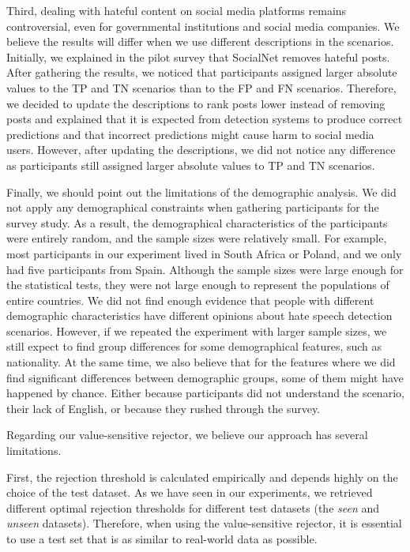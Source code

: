 %
Third, dealing with hateful content on social media platforms remains controversial, even for governmental institutions and social media companies.
%
We believe the results will differ when we use different descriptions in the scenarios.
%
Initially, we explained in the pilot survey that SocialNet removes hateful posts.
%
After gathering the results, we noticed that participants assigned larger absolute values to the TP and TN scenarios than to the FP and FN scenarios.
%
Therefore, we decided to update the descriptions to rank posts lower instead of removing posts and explained that it is expected from detection systems to produce correct predictions and that incorrect predictions might cause harm to social media users.
%
However, after updating the descriptions, we did not notice any difference as participants still assigned larger absolute values to TP and TN scenarios.
%

%
Finally, we should point out the limitations of the demographic analysis.
%
We did not apply any demographical constraints when gathering participants for the survey study.
%
As a result, the demographical characteristics of the participants were entirely random, and the sample sizes were relatively small.
%
For example, most participants in our experiment lived in South Africa or Poland, and we only had five participants from Spain.
%
Although the sample sizes were large enough for the statistical tests, they were not large enough to represent the populations of entire countries.
%
We did not find enough evidence that people with different demographic characteristics have different opinions about hate speech detection scenarios.
%
However, if we repeated the experiment with larger sample sizes, we still expect to find group differences for some demographical features, such as nationality.
%
At the same time, we also believe that for the features where we did find significant differences between demographic groups, some of them might have happened by chance.
%
Either because participants did not understand the scenario, their lack of English, or because they rushed through the survey.
%

%
Regarding our value-sensitive rejector, we believe our approach has several limitations.
%

%
First, the rejection threshold is calculated empirically and depends highly on the choice of the test dataset.
%
As we have seen in our experiments, we retrieved different optimal rejection thresholds for different test datasets (the \emph{seen} and \emph{unseen} datasets).
%
Therefore, when using the value-sensitive rejector, it is essential to use a test set that is as similar to real-world data as possible.
%


